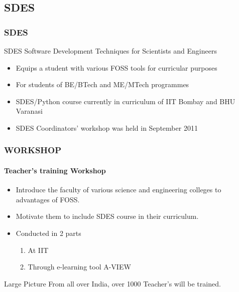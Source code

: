 \documentclass[compress,red]{beamer} %
\begin{document}
\subsection{SDES}
\begin{frame}
\frametitle{SDES}
\begin{block}{SDES}
Software Development Techniques for Scientists and Engineers
\end{block}
\begin{itemize}
\item Equips a student with various FOSS tools for curricular purposes \pause
\item For students of BE/BTech and ME/MTech programmes \pause
\item SDES/Python course currently in curriculum of IIT Bombay and BHU Varanasi \pause
\item SDES Coordinators' workshop was held in September 2011 \pause
\end{itemize}
\end{frame}

\begin{frame}
\frametitle{WORKSHOP}
\framesubtitle{Teacher's training Workshop}
\begin{itemize}
\item Introduce the faculty of various science and engineering colleges to advantages of FOSS. \pause
\item Motivate them to include SDES course in their curriculum. \pause
\item Conducted in 2 parts
\begin{enumerate}
\item At IIT \pause
\item Through e-learning tool A-VIEW  \pause
\end{enumerate}
\end{itemize}

\begin{block}{Large Picture}
From all over India, over {\Large 1000} Teacher's will be trained.
\end{block}
\end{frame}
\end{document}
